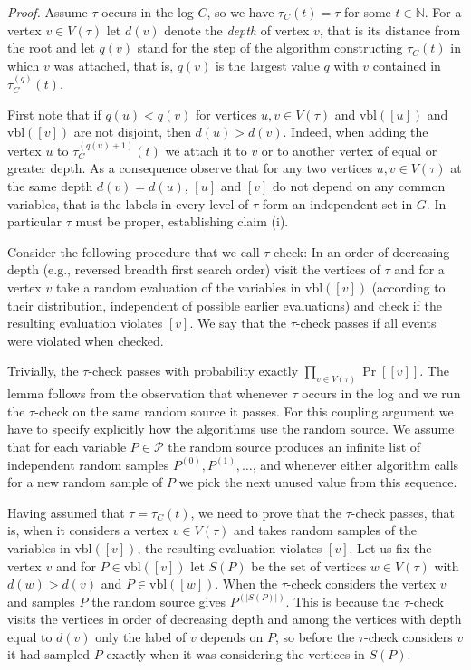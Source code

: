 \documentclass[11pt,a4paper]{article}
\DeclareMathOperator*{\pr}{Pr}
\begin{document}
\emph{Proof.}
Assume $\tau$ occurs in the log $C$, so we have $\tau_C(t)=\tau$ for some
$t\in \mathbb N$. For a vertex $v\in V(\tau)$ let $d(v)$ denote the
\emph{depth} of vertex $v$, that is its distance from the root and let $q(v)$ stand for the step of
the algorithm constructing $\tau_C(t)$ in which $v$ was attached, that is,
$q(v)$ is the largest value $q$ with $v$ contained in $\tau_C^{(q)}(t)$.

First note that if $q(u)<q(v)$ for vertices $u,v\in V(\tau)$ and
$\mbox{vbl}([u])$ and $\mbox{vbl}([v])$ are not disjoint, then $d(u)>d(v)$. Indeed, when adding the vertex $u$
to $\tau_C^{(q(u)+1)}(t)$ we attach it to $v$ or to another vertex of equal or
greater depth. As a consequence observe that for any two vertices $u, v \in V(\tau)$ 
at the same depth $d(v)=d(u)$, $[u]$ and $[v]$ do not depend on any common variables, that is the labels in every level of $\tau$
form an independent set in $G$. In particular $\tau$ must be proper, establishing claim (i).

Consider the following procedure that we call $\tau$-check:
In an order of decreasing depth (e.g., reversed breadth first search order)
visit the vertices of $\tau$ and for a
vertex $v$ take a random evaluation of the variables in $\mbox{vbl}([v])$
(according to their distribution, independent of possible earlier evaluations)
and check if the resulting evaluation violates $[v]$. We say that the
$\tau$-check passes if all events were violated when checked.

Trivially, the $\tau$-check passes with probability exactly $\prod_{v\in
V(\tau)}\pr[[v]]$. The lemma follows from the observation that whenever
$\tau$ occurs in the log and we run the $\tau$-check on the same random source it
passes. For this coupling argument we have to specify explicitly
how the algorithms use the random source. We assume that for
each variable $P\in\mathcal P$ the random source produces an infinite list of
independent random samples $P^{(0)},P^{(1)},\ldots$, and whenever either algorithm
calls for a new random sample of $P$ we pick the next unused
value from this sequence.

Having assumed that $\tau=\tau_C(t)$, we need to prove that the $\tau$-check
passes, that is, when it considers a vertex $v\in V(\tau)$ and takes random
samples of the variables in $\mbox{vbl}([v])$, the resulting evaluation
violates $[v]$. Let us fix the vertex $v$ and for $P\in\mbox{vbl}([v])$ let
$S(P)$ be the set of vertices $w\in V(\tau)$ with $d(w)>d(v)$ and $P\in \mbox{vbl}([w])$. When the
$\tau$-check considers the vertex $v$ and samples $P$ the random source
gives $P^{(|S(P)|)}$. This is because the $\tau$-check visits the vertices in order of
decreasing depth and among the vertices with depth equal to $d(v)$ only the
label of $v$ depends on $P$, so before the $\tau$-check considers $v$ it had
sampled $P$ exactly when it was considering the vertices in $S(P)$.
\end{document}
